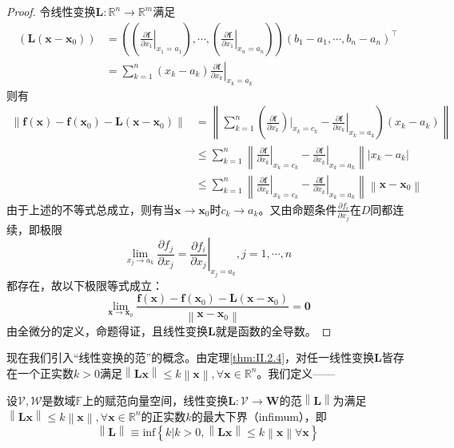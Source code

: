 \documentclass[main.tex]{subfiles}
\begin{document}
\begin{proof}
令线性变换$\mathbf{L}:\mathbb{R}^n\rightarrow \mathbb{R}^m$满足
\begin{align*}
\left(\mathbf{L}\left(\mathbf{x}-\mathbf{x}_0\right)\right)&=\left(\left(\left.\frac{\partial \mathbf{f}}{\partial x_1}\right|_{x_1=a_1}\right),\cdots,\left(\left.\frac{\partial \mathbf{f}}{\partial x_1}\right|_{x_n=a_n}\right)\right)\left(b_1-a_1,\cdots,b_n-a_n\right)^\intercal\\
&=\sum_{k=1}^n\left(x_k-a_k\right)\left.\frac{\partial \mathbf{f}}{\partial x_k}\right|_{x_k=a_k}
\end{align*}
则有
\begin{align*}
    \left\|\mathbf{f}\left(\mathbf{x}\right)-\mathbf{f}\left(\mathbf{x}_0\right)-\mathbf{L}\left(\mathbf{x}-\mathbf{x}_0\right)\right\|&=\left\|\sum_{k=1}^n\left(\left.\frac{\partial \mathbf{f}}{\partial x_k}\right)|_{x_k=c_k}-\left.\frac{\partial \mathbf{f}}{\partial x_k}\right|_{x_k=a_k}\right)\left(x_k-a_k\right)\right\|\\
    &\leq\sum_{k=1}^n\left\|\left.\frac{\partial \mathbf{f}}{\partial x_k}\right|_{x_k=c_k}-\left.\frac{\partial\mathbf{f}}{\partial x_k}\right|_{x_k=a_k}\right\|\left|x_k-a_k\right|\\
    &\leq\sum_{k=1}^n\left\|\left.\frac{\partial\mathbf{f}}{\partial x_k}\right|_{x_k=c_k}-\left.\frac{\partial\mathbf{f}}{\partial x_k}\right|_{x_k=a_k}\right\|\left\|\mathbf{x}-\mathbf{x}_0\right\|
\end{align*}
由于上述的不等式总成立，则有当$\mathbf{x}\to\mathbf{x}_0$时$c_k\to a_k$。又由命题条件$\frac{\partial f_i}{\partial x_j}$在$D$同都连续，即极限
\[
\lim_{x_j\to a_k}\frac{\partial f_j}{\partial x_j}=\left.\frac{\partial f_i}{\partial x_j}\right|_{x_j=a_k},j=1,\cdots,n
\]
都存在，故以下极限等式成立：
\[\lim_{\mathbf{x}\to\mathbf{x}_0}\frac{\mathbf{f}\left(\mathbf{x}\right)-\mathbf{f}\left(\mathbf{x}_0\right)-\mathbf{L}\left(\mathbf{x}-\mathbf{x}_0\right)}{\left\|\mathbf{x}-\mathbf{x}_0\right\|}=\mathbf{0}
\]
由全微分的定义，命题得证，且线性变换$\mathbf{L}$就是函数的全导数。
\end{proof}

现在我们引入“线性变换的范”的概念。由定理\ref{thm:II.2.4}，对任一线性变换$\mathbf{L}$皆存在一个正实数$k>0$满足$\left\|\mathbf{Lx}\right\|\leq k\left\|\mathbf{x}\right\|,\forall\mathbf{x}\in\mathbb{R}^n$。我们定义——

\begin{definition}[线性变换的范]
设$\mathcal{V},\mathcal{W}$是数域$\mathbb{F}$上的赋范向量空间，线性变换$\mathbf{L}:\mathcal{V}\rightarrow\mathbf{W}$的范$\left\|\mathbf{L}\right\|$为满足$\left\|\mathbf{Lx}\right\|\leq k\left\|\mathbf{x}\right\|,\forall\mathbf{x}\in\mathbb{R}^n$的正实数$k$的最大下界（infimum），即
\[\left\|\mathbf{L}\right\|\equiv\mathrm{inf}\left\{k|k>0,\left\|\mathbf{Lx}\right\|\leq k\left\|\mathbf{x}\right\|\forall\mathbf{x}\right\}\]
\end{definition}
\end{document}
